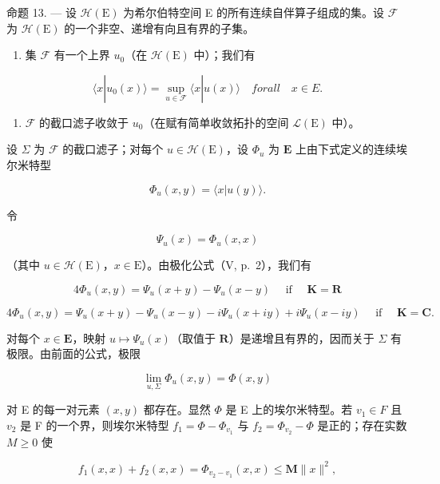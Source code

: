 命题 13. --- 设 \(\mathcal{H}(\mathrm{E})\) 为希尔伯特空间 E 的所有连续自伴算子组成的集。设 \(\mathcal{F}\) 为 \(\mathcal{H}(\mathrm{E})\) 的一个非空、递增有向且有界的子集。

\begin{enumerate}
\def\labelenumi{(\roman{enumi})}
\tightlist
\item
  集 \(\mathcal{F}\) 有一个上界 \(u_0\)（在 \(\mathcal{H}(\mathrm{E})\) 中）；我们有
\end{enumerate}

\[
\langle x | u _ {0} (x) \rangle = \sup _ {u \in \mathcal {F}} \langle x | u (x) \rangle \quad f o r a l l \quad x \in E.\tag{18}
\]

\begin{enumerate}
\def\labelenumi{(\roman{enumi})}
\setcounter{enumi}{1}
\tightlist
\item
  \(\mathcal{F}\) 的截口滤子收敛于 \(u_0\)（在赋有简单收敛拓扑的空间 \(\mathcal{L}(\mathrm{E})\) 中）。
\end{enumerate}

设 \(\Sigma\) 为 \(\mathcal{F}\) 的截口滤子；对每个 \(u \in \mathcal{H}(\mathrm{E})\)，设 \(\Phi_u\) 为 \(\mathbf{E}\) 上由下式定义的连续埃尔米特型

\[
\Phi_ {u} (x, y) = \langle x | u (y) \rangle .
\]

令

\[
\Psi_ {u} (x) = \Phi_ {u} (x, x)
\]

（其中 \(u \in \mathcal{H}(\mathrm{E})\)，\(x \in \mathrm{E}\)）。由极化公式（V, p.~2），我们有

\[
4 \Phi_ {u} (x, y) = \Psi_ {u} (x + y) - \Psi_ {u} (x - y) \quad \text { if } \quad \mathbf {K} = \mathbf {R}\tag{19}
\]

\[
4 \Phi_ {u} (x, y) = \Psi_ {u} (x + y) - \Psi_ {u} (x - y) - i \Psi_ {u} (x + i y) + i \Psi_ {u} (x - i y) \quad \text { if } \quad \mathbf {K} = \mathbf {C}.\tag{20}
\]

对每个 \(x \in \mathbf{E}\)，映射 \(u \mapsto \Psi_u(x)\)（取值于 \(\mathbf{R}\)）是递增且有界的，因而关于 \(\Sigma\) 有极限。由前面的公式，极限

\[
\lim _ {u, \Sigma} \Phi_ {u} (x, y) = \Phi (x, y)
\]

对 E 的每一对元素 \((x, y)\) 都存在。显然 \(\Phi\) 是 E 上的埃尔米特型。若 \(v_{1} \in F\) 且 \(v_{2}\) 是 F 的一个界，则埃尔米特型 \(f_{1} = \Phi - \Phi_{v_{1}}\) 与 \(f_{2} = \Phi_{v_{2}} - \Phi\) 是正的；存在实数 \(M \geqslant 0\) 使

\[
f _ {1} (x, x) + f _ {2} (x, x) = \Phi_ {v _ {2} - v _ {1}} (x, x) \leqslant \mathbf {M} \| x \| ^ {2},
\]

